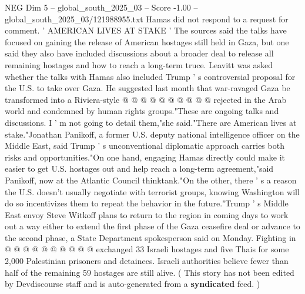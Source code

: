 \begin{textsample}{NEG Dim 5 – global\_south\_2025\_03 – Score -1.00 – global\_south\_2025\_03/121988955.txt}
Hamas did not respond to a request for comment. ' AMERICAN LIVES AT STAKE ' The sources said the talks have focused on gaining the release of American hostages still held in Gaza, but one said they also have included discussions about a broader deal to release all remaining hostages and how to reach a long-term truce.
Leavitt was asked whether the talks with Hamas also included Trump ' s controversial proposal for the U.S. to take over Gaza.
He suggested last month that war-ravaged Gaza be transformed into a Riviera-style @ @ @ @ @ @ @ @ @ @ rejected in the Arab world and condemned by human rights groups."These are ongoing talks and discussions.
I ' m not going to detail them,"she said."There are American lives at stake."Jonathan Panikoff, a former U.S. deputy national intelligence officer on the Middle East, said Trump ' s unconventional diplomatic approach carries both risks and opportunities."On one hand, engaging Hamas directly could make it easier to get U.S. hostages out and help reach a long-term agreement,"said Panikoff, now at the Atlantic Council thinktank."On the other, there ' s a reason the U.S. doesn't usually negotiate with terrorist groups, knowing Washington will do so incentivizes them to repeat the behavior in the future."Trump ' s Middle East envoy Steve Witkoff plans to return to the region in coming days to work out a way either to extend the first phase of the Gaza ceasefire deal or advance to the second phase, a State Department spokesperson said on Monday.
Fighting in @ @ @ @ @ @ @ @ @ @ exchanged 33 Israeli hostages and five Thais for some 2,000 Palestinian prisoners and detainees.
Israeli authorities believe fewer than half of the remaining 59 hostages are still alive. ( This story has not been edited by Devdiscourse staff and is auto-generated from a \textbf{syndicated} feed. )

\end{textsample}
